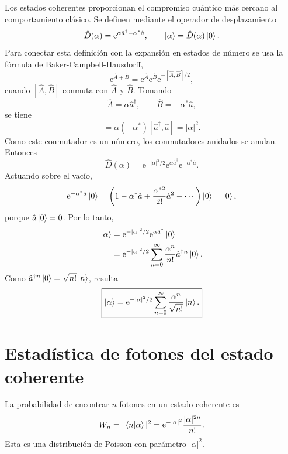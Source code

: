 \documentclass[11pt]{article}
\newcommand{\ee}{\mathrm{e}}
\newcommand{\adag}{\hat a^\dagger}
\begin{document}
Los estados coherentes proporcionan el compromiso cu\'antico m\'as cercano al
comportamiento cl\'asico. Se definen mediante el operador de desplazamiento
\begin{equation}
  \hat D(\alpha)
  =
  \ee^{\alpha\adag-\alpha^*\hat a},
  \qquad
  \ket{\alpha}=\hat D(\alpha)\ket0.
\end{equation}
Para conectar esta definici\'on con la expansi\'on en estados de n\'umero se
usa la f\'ormula de Baker-Campbell-Hausdorff,
\begin{equation}
  \ee^{\hat A+\hat B}
  =
  \ee^{\hat A}\ee^{\hat B}\ee^{-[\hat A,\hat B]/2},
\end{equation}
cuando $[\hat A,\hat B]$ conmuta con $\hat A$ y $\hat B$. Tomando
\begin{equation}
  \hat A=\alpha\adag,
  \qquad
  \hat B=-\alpha^*\hat a,
\end{equation}
se tiene
\begin{equation}
  [\hat A,\hat B]
  =
  \alpha(-\alpha^*)[\adag,\hat a]
  =
  |\alpha|^2.
\end{equation}
Como este conmutador es un n\'umero, los conmutadores anidados se anulan.
Entonces
\begin{equation}
  \hat D(\alpha)
  =
  \ee^{-|\alpha|^2/2}
  \ee^{\alpha\adag}
  \ee^{-\alpha^*\hat a}.
\end{equation}
Actuando sobre el vac\'io,
\begin{equation}
  \ee^{-\alpha^*\hat a}\ket0
  =
  \left(
  1-\alpha^*\hat a+\frac{\alpha^{*2}}{2!}\hat a^2-\cdots
  \right)\ket0
  =
  \ket0,
\end{equation}
porque $\hat a\ket0=0$. Por lo tanto,
\begin{align}
  \ket{\alpha}
  &=
  \ee^{-|\alpha|^2/2}
  \ee^{\alpha\adag}\ket0 \notag\\
  &=
  \ee^{-|\alpha|^2/2}
  \sum_{n=0}^{\infty}
  \frac{\alpha^n}{n!}\adag{}^n\ket0.
\end{align}
Como $\adag{}^n\ket0=\sqrt{n!}\ket n$, resulta
\begin{equation}
  \boxed{
  \ket{\alpha}
  =
  \ee^{-|\alpha|^2/2}
  \sum_{n=0}^{\infty}
  \frac{\alpha^n}{\sqrt{n!}}\ket n.
  }
\end{equation}

\section{Estad\'istica de fotones del estado coherente}

La probabilidad de encontrar $n$ fotones en un estado coherente es
\begin{equation}
  W_n
  =
  |\braket{n|\alpha}|^2
  =
  \ee^{-|\alpha|^2}
  \frac{|\alpha|^{2n}}{n!}.
\end{equation}
Esta es una distribuci\'on de Poisson con par\'ametro $|\alpha|^2$.
\end{document}
